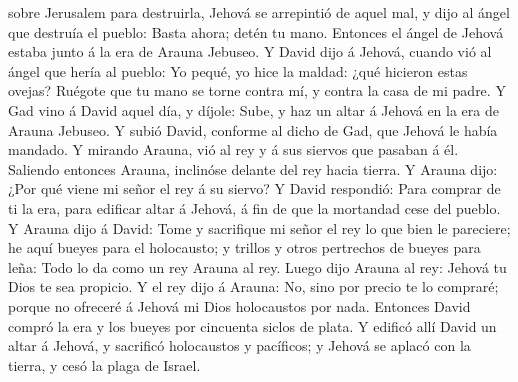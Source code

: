 sobre Jerusalem para destruirla, Jehová se arrepintió de aquel mal, y
dijo al ángel que destruía el pueblo: Basta ahora; detén tu mano.
Entonces el ángel de Jehová estaba junto á la era de Arauna Jebuseo.
 Y David dijo á Jehová, cuando vió al ángel que hería al
pueblo: Yo pequé, yo hice la maldad: ¿qué hicieron estas ovejas? Ruégote
que tu mano se torne contra mí, y contra la casa de mi padre.
 Y Gad vino á David aquel día, y díjole: Sube, y haz un
altar á Jehová en la era de Arauna Jebuseo.  Y subió David,
conforme al dicho de Gad, que Jehová le había mandado.  Y
mirando Arauna, vió al rey y á sus siervos que pasaban á él. Saliendo
entonces Arauna, inclinóse delante del rey hacia tierra.  Y
Arauna dijo: ¿Por qué viene mi señor el rey á su siervo? Y David
respondió: Para comprar de ti la era, para edificar altar á Jehová, á
fin de que la mortandad cese del pueblo.  Y Arauna dijo á
David: Tome y sacrifique mi señor el rey lo que bien le pareciere; he
aquí bueyes para el holocausto; y trillos y otros pertrechos de bueyes
para leña:  Todo lo da como un rey Arauna al rey. Luego
dijo Arauna al rey: Jehová tu Dios te sea propicio.  Y el
rey dijo á Arauna: No, sino por precio te lo compraré; porque no
ofreceré á Jehová mi Dios holocaustos por nada. Entonces David compró la
era y los bueyes por cincuenta siclos de plata.  Y edificó
allí David un altar á Jehová, y sacrificó holocaustos y pacíficos; y
Jehová se aplacó con la tierra, y cesó la plaga de Israel.
